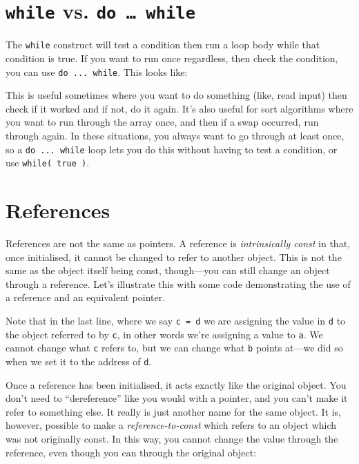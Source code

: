 \documentclass[a4paper]{scrartcl}
\begin{document}
\section{\texttt{while} vs. \texttt{do \ldots\ while}}
The \verb|while| construct will test a condition then run a loop body while that condition is true. If you want to run once regardless, then check the condition, you can use \verb|do ... while|. This looks like:



This is useful sometimes where you want to do something (like, read input) then check if it worked and if not, do it again. It's also useful for sort algorithms where you want to run through the array once, and then if a swap occurred, run through again. In these situations, you always want to go through at least once, so a \verb|do ... while| loop lets you do this without having to test a condition, or use \verb|while( true )|.

\section{References}
References are not the same as pointers. A reference is \emph{intrinsically const} in that, once initialised, it cannot be changed to refer to another object. This is not the same as the object itself being const, though---you can still change an object through a reference. Let's illustrate this with some code demonstrating the use of a reference and an equivalent pointer.



Note that in the last line, where we say \verb|c = d| we are assigning the value in \verb|d| to the object referred to by \verb|c|, in other words we're assigning a value to \verb|a|. We cannot change what \verb|c| refers to, but we can change what \verb|b| points at---we did so when we set it to the address of \verb|d|.

Once a reference has been initialised, it acts exactly like the original object. You don't need to ``dereference'' like you would with a pointer, and you can't make it refer to something else. It really is just another name for the same object. It is, however, possible to make a \emph{reference-to-const} which refers to an object which was not originally const. In this way, you cannot change the value through the reference, even though you can through the original object:


\end{document}
